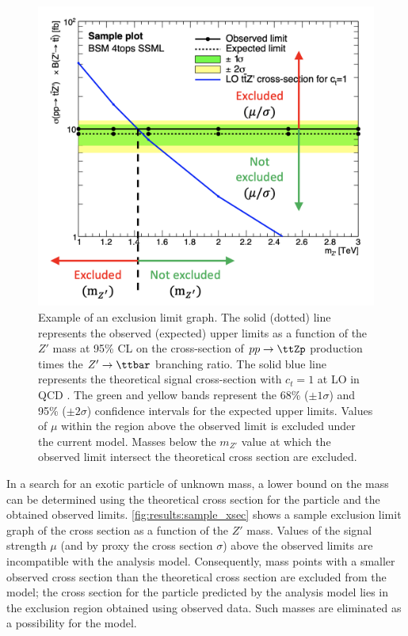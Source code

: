 \documentclass[../thesis.tex]{subfiles}
\begin{document}
\begin{figure}[!htb]
\centering
\includegraphics[width=0.8\linewidth]{fig/theory_sample_xsec.png}
\caption{\label{fig:results:sample_xsec}Example of an exclusion limit graph. The solid (dotted) line represents the observed (expected) upper limits as a function of the $Z'$ mass at 95\% \acs{CL} on the cross-section of $pp\rightarrow\ttZp$ production times the $Z'\rightarrow\ttbar$ branching ratio. The solid blue line represents the theoretical signal cross-section with $c_t=1$ at \acs{LO} in \acs{QCD} \citep{theory:ttZp_LHC}. The green and yellow bands represent the 68\% ($\pm 1\sigma$) and 95\% ($\pm 2\sigma$) confidence intervals for the expected upper limits. Values of $\mu$ within the region above the observed limit is excluded under the current model. Masses below the $m_{Z'}$ value at which the observed limit intersect the theoretical cross section are excluded.}
\end{figure}

In a search for an exotic particle of unknown mass, a lower bound on the mass can be determined using the theoretical cross section for the particle and the obtained observed limits. \autoref{fig:results:sample_xsec} shows a sample exclusion limit graph of the \ttZp cross section as a function of the $Z'$ mass. Values of the signal strength $\mu$ (and by proxy the cross section $\sigma$) above the observed limits are incompatible with the analysis model. Consequently, mass points with a smaller observed cross section than the theoretical cross section are excluded from the model; the cross section for the particle predicted by the analysis model lies in the exclusion region obtained using observed data. Such masses are eliminated as a possibility for the model.
\end{document}
